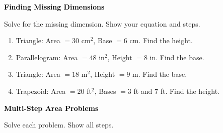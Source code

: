 \documentclass[12pt, letterpaper, fleqn]{article}
\begin{document}
\newpage

\begin{tcolorbox}[colback=black!10]
\large\textcolor{black}{\textbf{Finding Missing Dimensions}}
\end{tcolorbox}

\noindent
Solve for the missing dimension. Show your equation and steps.

\vspace{3mm}

\begin{enumerate}[itemsep=2.2cm, leftmargin=0.6cm]

\item Triangle: Area $= 30$ cm$^2$, Base $= 6$ cm. Find the height.

\vspace{1.8cm}

\item Parallelogram: Area $= 48$ in$^2$, Height $= 8$ in. Find the base.

\vspace{1.8cm}

\item Triangle: Area $= 18$ m$^2$, Height $= 9$ m. Find the base.

\vspace{1.8cm}

\item Trapezoid: Area $= 20$ ft$^2$, Bases $= 3$ ft and $7$ ft. Find the height.

\vspace{1.8cm}

\end{enumerate}

\newpage

\begin{tcolorbox}[colback=black!10]
\large\textcolor{black}{\textbf{Multi-Step Area Problems}}
\end{tcolorbox}

\noindent
Solve each problem. Show all steps.

\vspace{3mm}
\end{document}
